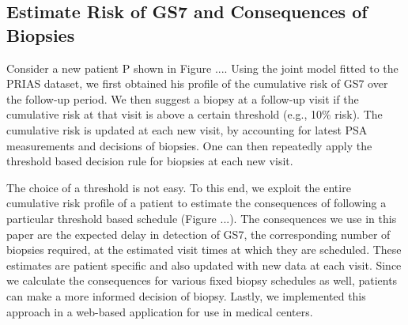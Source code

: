 \subsection{Estimate Risk of GS7 and Consequences of Biopsies}
Consider a new patient P shown in Figure .... Using the joint model fitted to the PRIAS dataset, we first obtained his profile of the cumulative risk of GS7 over the follow-up period. We then suggest a biopsy at a follow-up visit if the cumulative risk at that visit is above a certain threshold (e.g., 10\% risk). The cumulative risk is updated at each new visit, by accounting for latest PSA measurements and decisions of biopsies. One can then repeatedly apply the threshold based decision rule for biopsies at each new visit. 

The choice of a threshold is not easy. To this end, we exploit the entire cumulative risk profile of a patient to estimate the consequences of following a particular threshold based schedule (Figure ...). The consequences we use in this paper are the expected delay in detection of GS7, the corresponding number of biopsies required, at the estimated visit times at which they are scheduled. These estimates are patient specific and also updated with new data at each visit. Since we calculate the consequences for various fixed biopsy schedules as well, patients can make a more informed decision of biopsy. Lastly, we implemented this approach in a web-based application for use in medical centers.